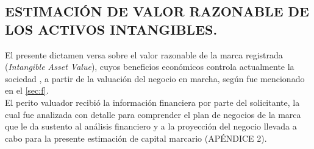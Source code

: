 \subsection{ESTIMACI\'ON DE VALOR RAZONABLE DE LOS ACTIVOS INTANGIBLES.}

 El presente dictamen versa sobre el valor razonable de la marca registrada \textcolor{principal}{\marca} (\textit{Intangible Asset Value}), cuyos beneficios econ\'omicos controla actualmente la sociedad \textcolor{principal}{\empresaSolicitante{}}, a partir de la valuaci\'on del negocio en marcha, seg\'un fue mencionado en el \autoref{sec:f}.\\[10pt]

El perito valuador recibi\'o la informaci\'on financiera por parte del solicitante, la cual fue analizada con detalle para comprender el plan de negocios de la marca que le da sustento al an\'alisis financiero y a la proyecci\'on del negocio llevada a cabo para la presente estimaci\'on de capital marcario (\textcolor{terciario}{AP\'ENDICE 2}).\\[10pt] 

